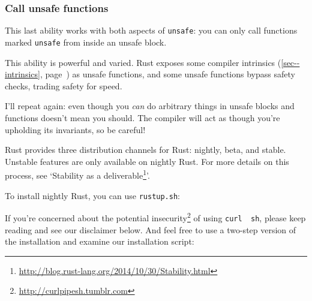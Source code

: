 \documentclass[a4paper,]{book}
\renewcommand*{\hyperref}[2][\ar]{%
  \def\ar{#2}%
  #2 (\autoref{#1}, page~\pageref{#1})}
\newenvironment{Shaded}{\begin{snugshade}}{\end{snugshade}}
\newcommand{\KeywordTok}[1]{\textcolor[rgb]{0.13,0.29,0.53}{\textbf{{#1}}}}
\newcommand{\NormalTok}[1]{{#1}}
\renewcommand{\href}[2]{#2\footnote{\url{#1}}}
\begin{document}
\subsubsection{Call unsafe functions}\label{call-unsafe-functions}

This last ability works with both aspects of \texttt{unsafe}: you can
only call functions marked \texttt{unsafe} from inside an unsafe block.

This ability is powerful and varied. Rust exposes some
\hyperref[sec--intrinsics]{compiler intrinsics} as unsafe functions, and
some unsafe functions bypass safety checks, trading safety for speed.

I'll repeat again: even though you \emph{can} do arbitrary things in
unsafe blocks and functions doesn't mean you should. The compiler will
act as though you're upholding its invariants, so be careful!


Rust provides three distribution channels for Rust: nightly, beta, and
stable. Unstable features are only available on nightly Rust. For more
details on this process, see
`\href{http://blog.rust-lang.org/2014/10/30/Stability.html}{Stability as
a deliverable}'.

To install nightly Rust, you can use \texttt{rustup.sh}:

\begin{Shaded}
\end{Shaded}

If you're concerned about the
\href{http://curlpipesh.tumblr.com}{potential insecurity} of using
\texttt{curl\ \textbar{}\ sh}, please keep reading and see our
disclaimer below. And feel free to use a two-step version of the
installation and examine our installation script:

\begin{Shaded}
\end{Shaded}
\end{document}
